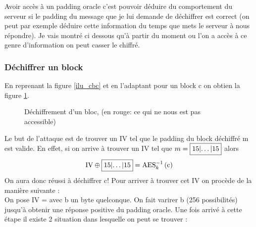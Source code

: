 \documentclass[a4paper, 12pt]{article}
\begin{document}
Avoir accès à un padding oracle c'est pouvoir déduire du comportement du serveur si le padding du message que je lui demande de déchiffrer est correct (on peut par exemple déduire cette information du temps que mets le serveur à nous répondre).
Je vais montré ci dessous qu'à partir du moment ou l'on a accès à ce genre d'information on peut casser le chiffré.

\subsubsection{Déchiffrer un block}
En reprenant la figure \ref{ilu_cbc} et en l'adaptant pour un block c on obtien la figure \ref{cbcdec1block}. 

\begin{figure}[h]
\centering
{}
\caption{Déchiffrement d'un bloc, (en rouge: ce qui ne nous est pas accessible)}
\label{cbcdec1block}
\end{figure}

Le but de l'attaque est de trouver un IV tel que le padding du block déchiffré m est valide. En effet, si on arrive à trouver un IV tel que $m = \fbox{15|\dots|15}$ alors 
$$ 
\text{IV} \oplus \fbox{15|\dots|15} = \text{AES}^{-1}_{k}\left(\text{c}\right)
$$
On aura donc réussi à déchiffrer c! Pour arriver à trouver cet IV on procède de la manière suivante : \\

On pose IV =  avec b un byte quelconque. On fait varirer b (256 possibilités) jusqu'à obtenir une réponse positive du padding oracle. Une fois arrivé à cette étape il existe 2 situation dans lesquelle on peut se trouver :
\end{document}
